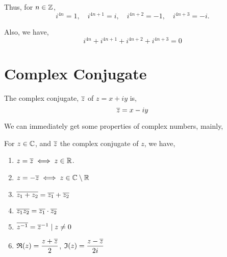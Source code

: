 Thus, for \(n \in \mathbb Z\), 
\[i^{4n} = 1, \quad i^{4n+1} = i, \quad i^{4n+2} = -1, \quad i^{4n+3} = -i.\]

Also, we have, 
\[i^{4n} + i^{4n+1} + i^{4n+2} + i^{4n+3} = 0\]

\section{Complex Conjugate}

\begin{definition}
    The complex conjugate, \(\overline{z}\) of \(z = x + iy\) is,
    \[\overline{z} = x - iy\]
\end{definition}

We can immediately get some properties of complex numbers,
mainly,

\begin{proposition}
    For \(z \in \mathbb C\), and \(\overline{z}\) the complex conjugate of \(z\), we have,
    \begin{enumerate}
        \item \(z = \overline{z} \iff z \in \mathbb R\).
        \item \(z = -\overline{z} \iff z \in \mathbb C \setminus \mathbb R\)
        \item \(\overline{z_1 + z_2} = \overline{z_1} + \overline{z_2}\)
        \item \(\overline{z_1z_2} = \overline{z_1} \cdot \overline{z_2}\)
        \item \(\overline{z^{-1}} = \overline{z}^{-1} \mid z \ne 0\)
        \item  \(\mathfrak{R}(z) = \dfrac{z + \overline{z}}{2}\), \(\mathfrak{I}(z) = \dfrac{z - \overline{z}}{2i}\) 
    \end{enumerate}
\end{proposition}



